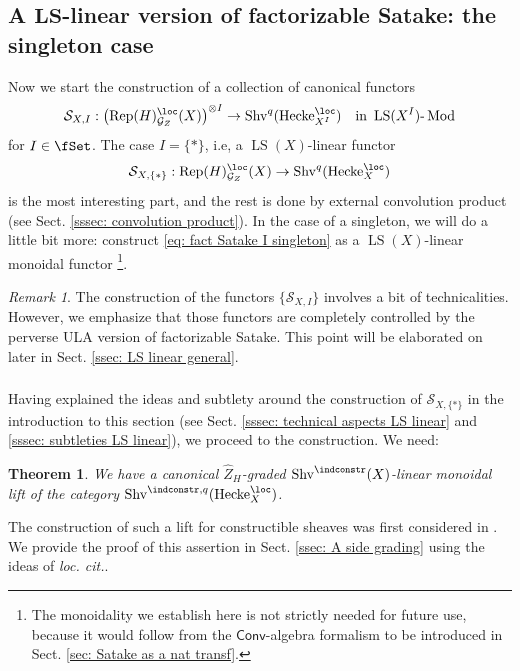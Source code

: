 \documentclass[10pt]{amsart}
\newcommand{\sssec}{\subsubsection}
\newtheorem{thm}[subsubsection]{Theorem}
\theoremstyle{remark}
\newtheorem{rmk}[subsubsection]{Remark}
\newcommand{\te}{\text}
\newcommand{\wh}{\widehat}
\newcommand{\on}{\operatorname}
\newcommand{\cG}{\mathcal{G}}
\newcommand{\cS}{\mathcal{S}}
\newcommand{\lMod}{\text{-}\on{Mod}}
\newcommand{\Rep}{\on{Rep}}
\newcommand{\Shv}{\on{Shv}}
\newcommand{\LS}{\on{LS}}
\newcommand{\Hecke}{\on{Hecke}}
\newcommand{\Conv}{\mathsf{Conv}}
\begin{document}
\subsection{A $\mathbf{LS}$-linear version of factorizable Satake: the singleton case}\label{ssec: LS linear fact Satake}
Now we start the construction of a collection of canonical functors 
\begin{equation*}
    \cS_{X,I}:\left(\Rep(H)^{\loc}_{\cG_Z}(X)\right)^{\otimes I}\rightarrow \Shv^q(\Hecke^{\loc}_{X^I})\quad \te{in } \LS(X^I)\lMod
\end{equation*}
for $I\in\fSet$.
The case $I=\{\ast\}$, i.e, a $\LS(X)$-linear functor
\begin{equation}\label{eq: fact Satake I singleton}
    \cS_{X,\{*\}}:\Rep(H)^{\loc}_{\cG_Z}(X)\rightarrow \Shv^q(\Hecke^{\loc}_{X})
\end{equation}
is the most interesting part, and the rest is done by external convolution product (see Sect. \ref{sssec: convolution product}). In the case of a singleton, we will do a little bit more: construct \eqref{eq: fact Satake I singleton} as a $\LS(X)$-linear monoidal functor \footnote{The monoidality we establish here is not strictly needed for future use, because it would follow from the $\Conv$-algebra formalism to be introduced in Sect. \ref{sec: Satake as a nat transf}.}.

\begin{rmk}\label{rmk: characterization of LS linear Satake}
    The construction of the functors $\{\cS_{X,I}\}$ involves a bit of technicalities. However, we emphasize that those functors are completely controlled by the perverse ULA version of factorizable Satake. This point will be elaborated on later in Sect. \ref{ssec: LS linear general}.
\end{rmk}


\sssec{}
Having explained the ideas and subtlety around the construction of $\cS_{X,\{*\}}$ in the introduction to this section (see Sect. \ref{sssec: technical aspects LS linear} and \ref{sssec: subtleties LS linear}), we proceed to the construction. We need:

\begin{thm}\label{thm: A side grading}
    We have a canonical $\wh{Z}_H$-graded $\Shv^{\indconstr}(X)$-linear monoidal lift of the category $\Shv^{\indconstr,q}(\Hecke^{\loc}_X)$.
\end{thm}


The construction of such a lift for constructible sheaves was first considered in \cite[Remark 5.3.7]{ZhaoNew}. We provide the proof of this assertion in Sect. \ref{ssec: A side grading} using the ideas of \emph{loc. cit.}.
\end{document}
